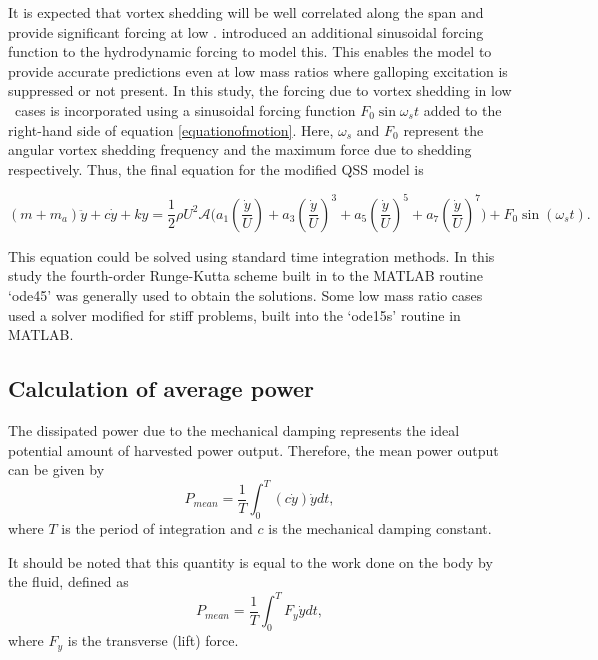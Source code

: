
 It is expected that vortex shedding will be well correlated along the span and provide significant forcing at low \reynoldsnumber. \citet{Joly2012} introduced  an additional sinusoidal forcing function to the hydrodynamic forcing to model this. This enables the model to provide accurate predictions even at low mass ratios where galloping excitation is suppressed or not present. In this study, the forcing due to vortex shedding in low \reynoldsnumber\ cases is incorporated using a sinusoidal forcing function $F_0\sin{\omega_{s}t}$ added to the right-hand side of equation \ref{equationofmotion}. Here, $\omega_{s}$ and $F_0$ represent the angular vortex shedding frequency and the maximum force due to shedding respectively. Thus, the final equation for the modified QSS model is

\begin{equation}
\label{final_equation_motion}
(m{+}m_a)\ddot{y}{+}c\dot{y}{+}ky{=}\frac{1}{2}\rho U^2 \mathcal  {A} \Bigg(a_1\left(\frac{\dot{y}}{U}\right){+}a_3\left(\frac{\dot{y}}{U}\right)^3{+}a_5\left(\frac{\dot{y}}{U}\right)^5{+}a_7\left(\frac{\dot{y}}{U}\right)^7 \Bigg){+} F_0\sin{(\omega_s t)}.
\end{equation}

This equation could be solved using standard time integration methods. In  this study the fourth-order Runge-Kutta scheme built in to the MATLAB routine `ode45' was generally used to obtain the solutions. Some low mass ratio cases used a solver modified for stiff problems, built into the `ode15s' routine in MATLAB.

\subsection{Calculation of average power}

 The dissipated power due to the mechanical damping represents the ideal potential amount of harvested power output. Therefore, the mean power output can be given by
\begin{equation}
\label{power}
P_{mean}=\frac{1}{T}\int_{0}^{T}(c\dot{y})\dot{y} dt,
\end{equation}
where $T$ is the period of integration and $c$ is the mechanical damping constant. 

It should be noted that this quantity is equal to the work done on the body by the fluid, defined as
\begin{equation}
\label{power_alt}
P_{mean}=\frac{1}{T}\int_{0}^{T}F_y\dot{y} dt,
\end{equation}
where $F_y$ is the transverse (lift) force.

